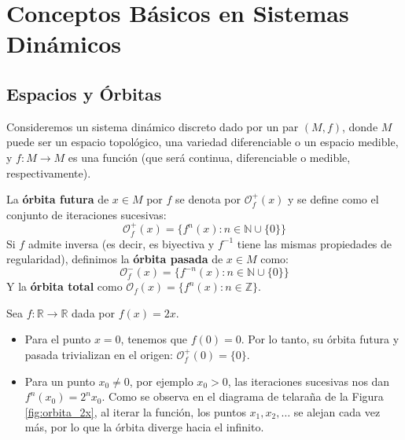 	\chapter{Conceptos Básicos en Sistemas Dinámicos}

\section{Espacios y Órbitas}

Consideremos un sistema dinámico discreto dado por un par $(M, f)$, donde $M$ puede ser un espacio topológico, una variedad diferenciable o un espacio medible, y $f: M \to M$ es una función (que será continua, diferenciable o medible, respectivamente). 

\begin{definicion}
	La \textbf{órbita futura} de $x \in M$ por $f$ se denota por $\mathcal{O}_f^+(x)$ y se define como el conjunto de iteraciones sucesivas:
	$$\mathcal{O}_f^+(x) = \{f^n(x) : n \in \mathbb{N} \cup \{0\}\}$$
	Si $f$ admite inversa (es decir, es biyectiva y $f^{-1}$ tiene las mismas propiedades de regularidad), definimos la \textbf{órbita pasada} de $x \in M$ como:
	$$\mathcal{O}_f^-(x) = \{f^{-n}(x) : n \in \mathbb{N} \cup \{0\}\}$$
	Y la \textbf{órbita total} como $\mathcal{O}_f(x) = \{f^n(x) : n \in \mathbb{Z}\}$.
\end{definicion}

\begin{ejemplo}
	Sea $f: \mathbb{R} \to \mathbb{R}$ dada por $f(x) = 2x$. 
	\begin{itemize}
		\item Para el punto $x = 0$, tenemos que $f(0) = 0$. Por lo tanto, su órbita futura y pasada trivializan en el origen: $\mathcal{O}_f^+(0) = \{0\}$.
		\item Para un punto $x_0 \neq 0$, por ejemplo $x_0 > 0$, las iteraciones sucesivas nos dan $f^n(x_0) = 2^n x_0$. Como se observa en el diagrama de telaraña de la Figura \ref{fig:orbita_2x}, al iterar la función, los puntos $x_1, x_2, \dots$ se alejan cada vez más, por lo que la órbita diverge hacia el infinito.
	\end{itemize}
\end{ejemplo}

